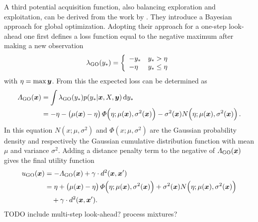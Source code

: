 A third potential acquisition function, also balancing exploration and 
exploitation, can be derived from the work by \textcite{Osborne:2009tn}. They 
introduce a Bayesian approach for global optimization. Adopting their approach 
for a one-step look-ahead one first defines a loss function equal to the 
negative maximum after making a new observation
\begin{equation}
    \lambda_{\mathrm{GO}} (y_*) = \left\{ \begin{array}{ll}-y_* & y_* > \eta \\ -\eta 
            & y_* \leq \eta \end{array} \right.
\end{equation}
with $\eta = \max \bm{y}$. From this the expected loss can be determined as
\begin{equation}\begin{split}
    \varLambda\ped{GO}(\vc x) &= \int \lambda\ped{GO}(y_*) p(y_* | \vc x, X, \vc 
    y) \dif y_* \\
    &= -\eta - \del{\mu(\vc x) - \eta} \varPhi\!\del{\eta; \mu(\vc x), 
        \sigma^2(\vc x)} - \sigma^2(\vc x) N\!\del{\eta; \mu(\vc x), 
        \sigma^2(\vc x)}
    \text{.}
\end{split}\end{equation}
In this equation $N(x; \mu, \sigma^2)$ and $\varPhi(x; \mu, \sigma^2)$ are the 
Gaussian probability density and respectively the Gaussian cumulative 
distribution function with mean $\mu$ and variance $\sigma^2$. Adding a distance 
penalty term to the negative of $\varLambda_{\mathrm{GO}}(\bm{x})$ gives the final 
utility function
\begin{align}\begin{split}
    u\ped{GO}(\vc x) &= -\varLambda\ped{GO}(\vc x) + \gamma \cdot d^2(\vc x, \vc 
    x') \\
    &= \eta + \del{\mu(\vc x) - \eta} \varPhi\!\del{\eta; \mu(\vc x), 
        \sigma^2(\vc x)} + \sigma^2(\vc x) N\!\del{\eta; \mu(\vc x), 
        \sigma^2(\vc x)}\\ &\quad+ \gamma \cdot d^2(\vc x, \vc x') \text{.}
\end{split} \end{align}
TODO include multi-step look-ahead? process mixtures?

